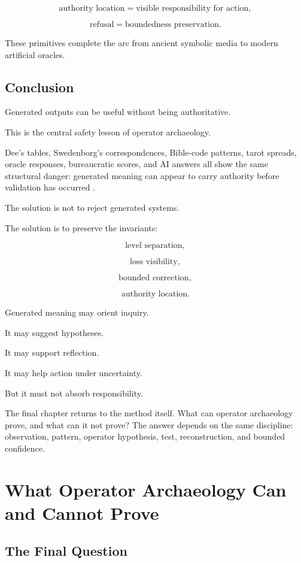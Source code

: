 \documentclass[11pt]{book}
\begin{document}
\[
\text{authority location} = \text{visible responsibility for action},
\]

\[
\text{refusal} = \text{boundedness preservation}.
\]

These primitives complete the arc from ancient symbolic media to modern artificial oracles.

\section{Conclusion}

Generated outputs can be useful without being authoritative.

This is the central safety lesson of operator archaeology.

Dee’s tables, Swedenborg’s correspondences, Bible-code patterns, tarot spreads, oracle responses, bureaucratic scores, and AI answers all show the same structural danger: generated meaning can appear to carry authority before validation has occurred \cite{DeeCasaubon1659TrueFaithfulRelation,SwedenborgHeavenHell,OConnor2016WeaponsMathDestruction,Cameron2026IPRP}.

The solution is not to reject generated systems.

The solution is to preserve the invariants:

\[
\text{level separation},
\]

\[
\text{loss visibility},
\]

\[
\text{bounded correction},
\]

\[
\text{authority location}.
\]

Generated meaning may orient inquiry.

It may suggest hypotheses.

It may support reflection.

It may help action under uncertainty.

But it must not absorb responsibility.

The final chapter returns to the method itself. What can operator archaeology prove, and what can it not prove? The answer depends on the same discipline: observation, pattern, operator hypothesis, test, reconstruction, and bounded confidence.

\chapter{What Operator Archaeology Can and Cannot Prove}

\section{The Final Question}
\end{document}
